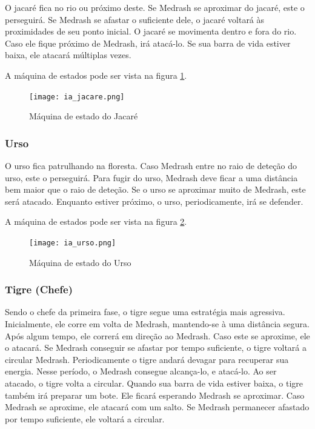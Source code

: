 O jacaré fica no rio ou próximo deste. Se Medrash se aproximar do jacaré,
este o perseguirá. Se Medrash se afastar o suficiente dele, o jacaré voltará às proximidades de seu ponto inicial.
O jacaré se movimenta dentro e fora do rio. Caso ele fique próximo de
Medrash, irá atacá-lo. Se sua barra de vida estiver baixa, ele atacará
múltiplas vezes.

A máquina de estados pode ser vista na figura \ref{fsm:jacare}.

\begin{figure}[!ht]
 \centering
 \texttt{[image: ia\_jacare.png]}
 \caption{Máquina de estado do Jacaré}
 \label{fsm:jacare}
\end{figure}

\subsubsection{Urso}

O urso fica patrulhando na floresta. Caso Medrash entre no raio de deteção
do urso, este o perseguirá. Para fugir do urso, Medrash deve ficar a uma
distância bem maior que o raio de deteção.
Se o urso se aproximar muito de Medrash, este será atacado. Enquanto estiver
próximo, o urso, periodicamente, irá se defender.

A máquina de estados pode ser vista na figura \ref{fsm:urso}.

\begin{figure}[!ht]
 \centering
 \texttt{[image: ia\_urso.png]}
 \caption{Máquina de estado do Urso}
 \label{fsm:urso}
\end{figure}

\subsubsection{Tigre (Chefe)}

Sendo o chefe da primeira fase, o tigre segue uma estratégia mais agressiva.
Inicialmente, ele corre em volta de Medrash, mantendo-se à uma distância
 segura. Após algum tempo, ele correrá em direção ao Medrash. Caso este se
 aproxime, ele o atacará. Se Medrash conseguir se afastar por tempo
 suficiente, o tigre voltará a circular Medrash.
Periodicamente o tigre andará devagar para recuperar sua energia. Nesse
período, o Medrash consegue alcança-lo, e atacá-lo. Ao ser atacado, o tigre
volta a circular.
Quando sua barra de vida estiver baixa, o tigre também irá preparar um
bote. Ele ficará esperando Medrash se aproximar. Caso Medrash se aproxime,
 ele atacará com um salto. Se Medrash permanecer afastado por tempo 
suficiente, ele voltará a circular.

